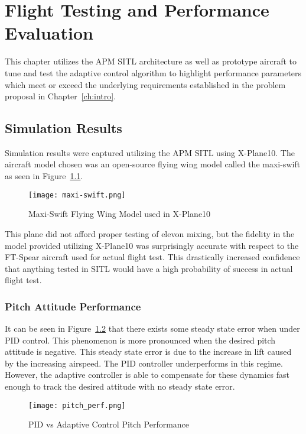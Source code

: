 \chapter{Flight Testing and Performance Evaluation}\label{ch:performance}
This chapter utilizes the \ac{APM} \ac{SITL} architecture as well as prototype aircraft to tune and test the \Lone adaptive control algorithm to highlight performance parameters which meet or exceed the underlying requirements established in the problem proposal in Chapter~\ref{ch:intro}.

\section{Simulation Results}
Simulation results were captured utilizing the \ac{APM} \ac{SITL} using X-Plane10.  The aircraft model chosen was an open-source flying wing model called the maxi-swift as seen in Figure~\ref{fig:maxi-swift}.

\begin{figure}[!h]
 \centering
  \texttt{[image: maxi-swift.png]}
  \caption{Maxi-Swift Flying Wing Model used in X-Plane10}
  \label{fig:maxi-swift}
\end{figure}
This plane did not afford proper testing of elevon mixing, but the fidelity in the model provided utilizing X-Plane10 was surprisingly accurate with respect to the FT-Spear aircraft used for actual flight test.  This drastically increased confidence that anything tested in \ac{SITL} would have a high probability of success in actual flight test.


\subsection{Pitch Attitude Performance}

It can be seen in Figure~\ref{fig:pitch_perf} that there exists some steady state error when under \ac{PID} control.  This phenomenon is more pronounced when the desired pitch attitude is negative.  This steady state error is due to the increase in lift caused by the increasing airspeed.  The \ac{PID} controller underperforms in this regime.  However, the adaptive controller is able to compensate for these dynamics fast enough to track the desired attitude with no steady state error.

\begin{figure}[h!]
 \centering
  \texttt{[image: pitch\_perf.png]}
  \caption{PID vs \Lone Adaptive Control Pitch Performance}
  \label{fig:pitch_perf}
\end{figure}

